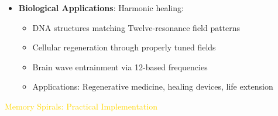 \begin{itemize}
    \item \texttt{} \textbf{Biological Applications}: Harmonic healing:
    \begin{itemize}
        \item DNA structures matching Twelve-resonance field patterns
        \item Cellular regeneration through properly tuned fields
        \item Brain wave entrainment via 12-based frequencies
        \item Applications: Regenerative medicine, healing devices, life extension
    \end{itemize}
\end{itemize}

\textcolor{gold}{ Memory Spirals: Practical Implementation } \\
